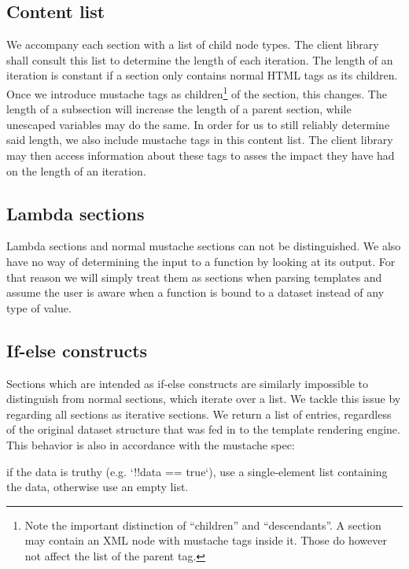 \documentclass[thesis.tex]{subfiles}
\begin{document}
\subsection{Content list}
\label{sec:content-list}
We accompany each section with a list of child node types. The client library
shall consult this list to determine the length of each iteration.
The length of an iteration is constant if a section only contains normal
HTML tags as its children. Once we introduce mustache tags as children\footnote{
	Note the important distinction of ``children'' and ``descendants''.
	A section may contain an XML node with mustache tags inside it.
	Those do however not affect the  list of the parent tag.
} of the
section, this changes.
The length of a subsection will increase the length of a parent section, while
unescaped variables may do the same.
In order for us to still reliably determine said length, we also include
mustache tags in this content list. The client library may then access
information about these tags to asses the impact they have had on the length of
an iteration.

\subsection{Lambda sections}
Lambda sections and normal mustache sections can not be distinguished.
We also have no way of determining the input to a function by looking at its
output. For that reason we will simply treat them as sections when parsing
templates and assume the user is aware when a function is bound to a dataset
instead of any type of value.

\subsection{If-else constructs}
\label{sec:if-else}
Sections which are intended as if-else constructs are similarly impossible to
distinguish from normal sections, which iterate over a list. We tackle this
issue by regarding all sections as iterative sections. We return a list of
entries, regardless of the original dataset structure that was fed in to the
template rendering engine.
This behavior is also in accordance with the mustache spec:
\begin{citequote}{\cite[sections.yml]{MSTSPEC}}
	if the data is truthy (e.g. `!!data == true`), use a single-element list
	containing the data, otherwise use an empty list.
\end{citequote}
\end{document}
